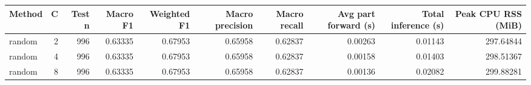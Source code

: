 \begin{tabular}{lrrrrrrrrr}
\toprule
Method & C & Test n & Macro F1 & Weighted F1 & Macro precision & Macro recall & Avg part forward (s) & Total inference (s) & Peak CPU RSS (MiB) \\
\midrule
random & 2 & 996 & 0.63335 & 0.67953 & 0.65958 & 0.62837 & 0.00263 & 0.01143 & 297.64844 \\
random & 4 & 996 & 0.63335 & 0.67953 & 0.65958 & 0.62837 & 0.00158 & 0.01403 & 298.51367 \\
random & 8 & 996 & 0.63335 & 0.67953 & 0.65958 & 0.62837 & 0.00136 & 0.02082 & 299.88281 \\
\bottomrule
\end{tabular}
